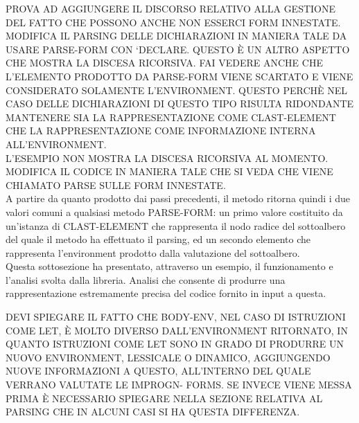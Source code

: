 PROVA AD AGGIUNGERE IL DISCORSO RELATIVO ALLA GESTIONE DEL FATTO CHE POSSONO
ANCHE NON ESSERCI FORM INNESTATE.\\

MODIFICA IL PARSING DELLE DICHIARAZIONI IN MANIERA TALE DA USARE PARSE-FORM
CON ‘DECLARE. QUESTO È UN ALTRO ASPETTO CHE MOSTRA LA DISCESA RICORSIVA. FAI
VEDERE ANCHE CHE L’ELEMENTO PRODOTTO DA PARSE-FORM VIENE SCARTATO E VIENE
CONSIDERATO SOLAMENTE L’ENVIRONMENT. QUESTO PERCHÈ NEL CASO DELLE
DICHIARAZIONI DI QUESTO TIPO RISULTA RIDONDANTE MANTENERE SIA LA
RAPPRESENTAZIONE COME CLAST-ELEMENT CHE LA RAPPRESENTAZIONE COME INFORMAZIONE
INTERNA ALL’ENVIRONMENT.\\

L’ESEMPIO NON MOSTRA LA DISCESA RICORSIVA AL MOMENTO. MODIFICA IL CODICE IN
MANIERA TALE CHE SI VEDA CHE VIENE CHIAMATO PARSE SULLE FORM INNESTATE.\\

A partire da quanto prodotto dai passi precedenti, il metodo ritorna quindi i
due valori comuni a qualsiasi metodo PARSE-FORM: un primo valore costituito da
un’istanza di CLAST-ELEMENT che rappresenta il nodo radice del sottoalbero del
quale il metodo ha effettuato il parsing, ed un secondo elemento che
rappresenta l’environment prodotto dalla valutazione del sottoalbero.\\

Questa sottosezione ha presentato, attraverso un esempio, il funzionamento e
l’analisi svolta dalla libreria. Analisi che consente di produrre una
rappresentazione estremamente precisa del codice fornito in input a questa.

DEVI SPIEGARE IL FATTO CHE BODY-ENV, NEL CASO DI ISTRUZIONI COME LET, È MOLTO
DIVERSO DALL’ENVIRONMENT RITORNATO, IN QUANTO ISTRUZIONI COME LET SONO IN
GRADO DI PRODURRE UN NUOVO ENVIRONMENT, LESSICALE O DINAMICO, AGGIUNGENDO
NUOVE INFORMAZIONI A QUESTO, ALL’INTERNO DEL QUALE VERRANO VALUTATE LE
IMPROGN- FORMS. SE INVECE VIENE MESSA PRIMA È NECESSARIO SPIEGARE NELLA
SEZIONE RELATIVA AL PARSING CHE IN ALCUNI CASI SI HA QUESTA DIFFERENZA.\\

